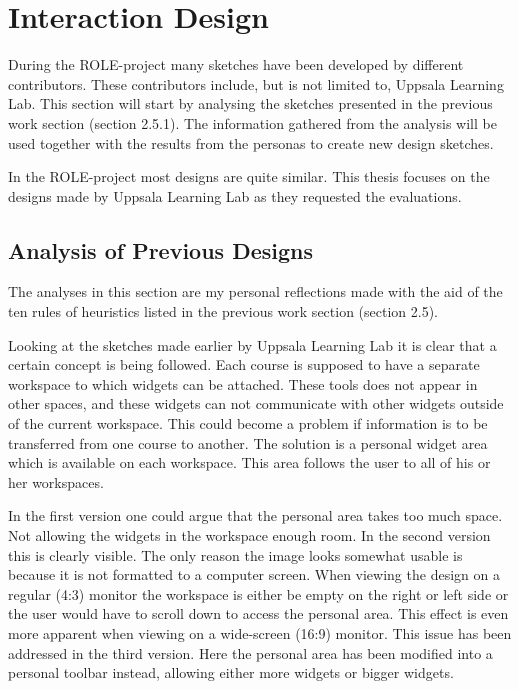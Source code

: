 \section {Interaction Design}
During the ROLE-project many sketches have been developed by different contributors. These contributors include, but is not limited to, Uppsala Learning Lab. This section will start by analysing the sketches presented in the previous work section (section 2.5.1). The information gathered from the analysis will be used together with the results from the personas to create new design sketches.

In the ROLE-project most designs are quite similar. This thesis focuses on the designs made by Uppsala Learning Lab as they requested the evaluations.

\subsection {Analysis  of Previous Designs}
The analyses in this section are my personal reflections made with the aid of the ten rules of heuristics listed in the previous work section (section 2.5).

Looking at the sketches made earlier by Uppsala Learning Lab it is clear that a certain concept is being followed. Each course is supposed to have a separate workspace to which widgets can be attached. These tools does not appear in other spaces, and these widgets can not communicate with other widgets outside of the current workspace. This could become a problem if information is to be transferred from one course to another. The solution is a personal widget area which is available on each workspace. This area follows the user to all of his or her workspaces.

In the first version one could argue that the personal area takes too much space. Not allowing the widgets in the workspace enough room. In the second version this is clearly visible. The only reason the image looks somewhat usable is because it is not formatted to a computer screen. When viewing the design on a regular (4:3) monitor the workspace is either be empty on the right or left side or the user would have to scroll down to access the personal area. This effect is even more apparent when viewing on a wide-screen (16:9) monitor. This issue has been addressed in the third version. Here the personal area has been modified into a personal toolbar instead, allowing either more widgets or bigger widgets.

